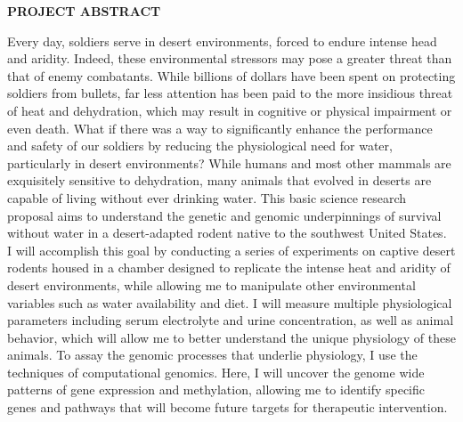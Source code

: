 \documentclass[12pt]{article}
\begin{document}

\setcounter{page}{1}

\begin{center}

 \textbf{PROJECT ABSTRACT} \\

\textsc{}

\end{center}


Every day, soldiers serve in desert environments, forced to endure intense head and aridity. Indeed, these environmental stressors may pose a greater threat than that of enemy combatants. While billions of dollars have been spent on protecting soldiers from bullets, far less attention has been paid to the more insidious threat of heat and dehydration, which may result in cognitive or physical impairment or even death. What if there was a way to significantly enhance the performance and safety of our soldiers by reducing the physiological need for water, particularly in desert environments? While humans and most other mammals are exquisitely sensitive to dehydration, many animals that evolved in deserts are capable of living without ever drinking water. This basic science research proposal aims to understand the genetic and genomic underpinnings of survival without water in a desert-adapted rodent native to the southwest United States. \\



I will accomplish this goal by conducting a series of experiments on captive desert rodents housed in a chamber designed to replicate the intense heat and aridity of desert environments, while allowing me to manipulate other environmental variables such as water availability and diet. I will measure multiple physiological parameters including serum electrolyte and urine concentration, as well as animal behavior, which will allow me to better understand the unique physiology of these animals. To assay the genomic processes that underlie physiology, I use the techniques of computational genomics. Here, I will uncover the genome wide patterns of gene expression and methylation, allowing me to identify specific genes and pathways that will become future targets for therapeutic intervention. \\  
\end{document}
